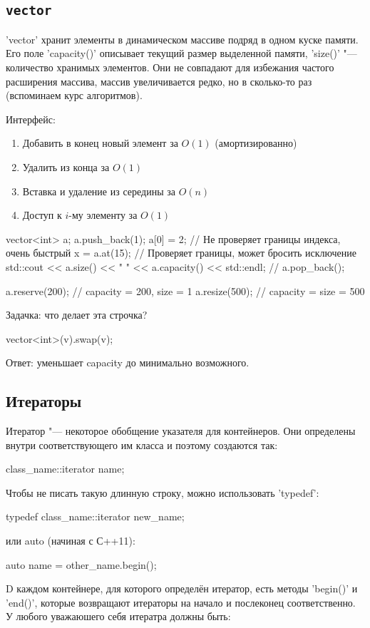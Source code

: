 \subsection{\texttt{vector}}
 
\cpp'vector' хранит элементы в динамическом массиве подряд в одном куске памяти.
Его поле \cpp'capacity()' описывает текущий размер выделенной памяти, \cpp'size()' "--- количество хранимых элементов.
Они не совпадают для избежания частого расширения массива, массив увеличивается редко, но в сколько-то раз (вспоминаем курс алгоритмов).
 
Интерфейс:
\begin{enumerate}
	\item Добавить в конец новый элемент за $O(1)$ (амортизированно)
	\item Удалить из конца за $O(1)$
	\item Вставка и удаление из середины за $O(n)$
	\item Доступ к $i$-му элементу за $O(1)$
\end{enumerate}
 
\begin{cppcode}
vector<int> a;
a.push_back(1);
a[0] = 2; // Не проверяет границы индекса, очень быстрый
x = a.at(15); // Проверяет границы, может бросить исключение
std::cout << a.size() << " " << a.capacity() << std::endl;
// a.pop_back();
 
a.reserve(200); // capacity = 200, size = 1
a.resize(500); // capacity = size = 500
\end{cppcode}

Задачка: что делает эта строчка? 
\begin{cppcode}
vector<int>(v).swap(v);
\end{cppcode}
Ответ: уменьшает capacity до минимально возможного.

\subsection{Итераторы}

Итератор "--- некоторое обобщение указателя для контейнеров.
Они определены внутри соответствующего им класса и поэтому создаются так:
\begin{cppcode}
class_name::iterator name;
\end{cppcode}
Чтобы не писать такую длинную строку, можно использовать \cpp'typedef':
\begin{cppcode}
typedef class_name::iterator new_name;
\end{cppcode}
или auto (начиная с С++11):
\begin{cppcode}
auto name = other_name.begin();
\end{cppcode}
D каждом контейнере, для которого определён итератор, есть методы \cpp'begin()' и \cpp'end()', которые возвращают итераторы на начало и послеконец соответственно. У любого уважаюшего себя итератра должны быть:

